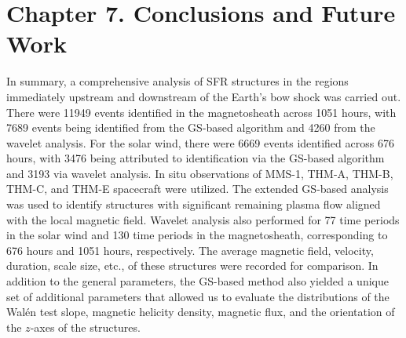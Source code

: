 \chapter{Chapter 7. Conclusions and Future Work}

In summary, a comprehensive analysis of SFR structures in the regions immediately upstream and downstream of the Earth's bow shock was carried out. There were 11949 events identified in the magnetosheath across 1051 hours, with 7689 events being identified from the GS-based algorithm and 4260 from the wavelet analysis. For the solar wind, there were 6669 events identified across 676 hours, with 3476 being attributed to identification via the GS-based algorithm and 3193 via wavelet analysis. In situ observations of MMS-1, THM-A, THM-B, THM-C, and THM-E spacecraft were utilized. The extended GS-based analysis was used to identify structures with significant remaining plasma flow aligned with the local magnetic field. Wavelet analysis also performed for 77 time periods in the solar wind and 130 time periods in the magnetosheath, corresponding to 676 hours and 1051 hours, respectively. The average magnetic field, velocity, duration, scale size, etc., of these structures were recorded for comparison. In addition to the general parameters, the GS-based method also yielded a unique set of additional parameters that allowed us to evaluate the distributions of the Wal\'en test slope, magnetic helicity density, magnetic flux, and the orientation of the $z$-axes of the structures.

